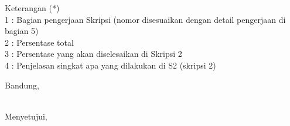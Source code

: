 \documentclass[a4paper,twoside]{article}
\begin{document}
Keterangan (*)\\
1 : Bagian pengerjaan Skripsi (nomor disesuaikan dengan detail pengerjaan di bagian 5)\\
2 : Persentase total \\
3 : Persentase yang akan diselesaikan di Skripsi 2 \\
4 : Penjelasan singkat apa yang dilakukan di S2 (skripsi 2) 

\vspace{1cm}
\centering Bandung, \tanggal\\
\vspace{2cm} \nama \\ 
\vspace{1cm}

Menyetujui, \\
\end{document}
